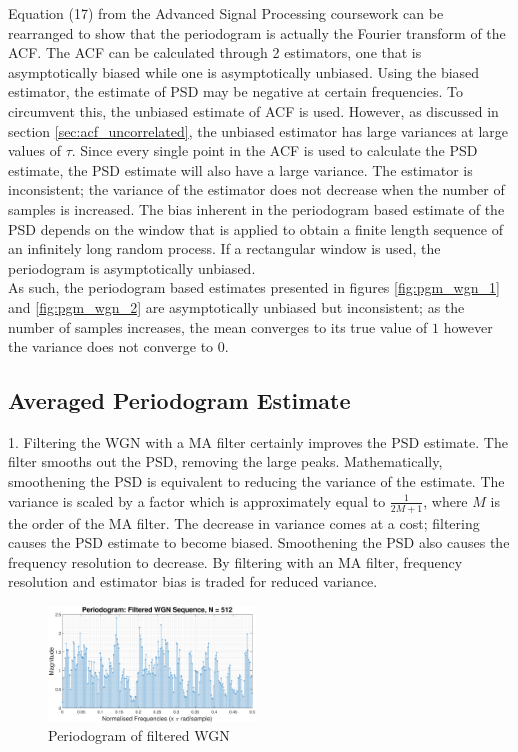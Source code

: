 \documentclass{article}
\begin{document}
Equation (17) from the Advanced Signal Processing coursework can be rearranged to show that the periodogram is actually the Fourier transform of the ACF. The ACF can be calculated through 2 estimators, one that is asymptotically biased while one is asymptotically unbiased. Using the biased estimator, the estimate of PSD may be negative at certain frequencies. To circumvent this, the unbiased estimate of ACF is used. However, as discussed in section \ref{sec:acf_uncorrelated}, the unbiased estimator has large variances at large values of $\tau$. Since every single point in the ACF is used to calculate the PSD estimate, the PSD estimate will also have a large variance. The estimator is inconsistent; the variance of the estimator does not decrease when the number of samples is increased. The bias inherent in the periodogram based estimate of the PSD depends on the window that is applied to obtain a finite length sequence of an infinitely long random process. If a rectangular window is used, the periodogram is asymptotically unbiased.\\

As such, the periodogram based estimates presented in figures \ref{fig:pgm_wgn_1} and \ref{fig:pgm_wgn_2} are asymptotically unbiased but inconsistent; as the number of samples increases, the mean converges to its true value of $1$ however the variance does not converge to $0$.  
\newpage
\subsection{Averaged Periodogram Estimate}

1. Filtering the WGN with a MA filter certainly improves the PSD estimate. The filter smooths out the PSD, removing the large peaks. Mathematically, smoothening the PSD is equivalent to reducing the variance of the estimate. The variance is scaled by a factor which is approximately equal to $\frac{1}{2M+1}$, where $M$ is the order of the MA filter. The decrease in variance comes at a cost; filtering causes the PSD estimate to become biased. Smoothening the PSD also causes the frequency resolution to decrease. By filtering with an MA filter, frequency resolution and estimator bias is traded for reduced variance. 

\begin{figure}[H]
    \centering
    \includegraphics[width=0.49\textwidth]{pgm_filtered_wgn_512}
    \caption{Periodogram of filtered WGN}
    \label{fig:pgm_filtered_wgn}
\end{figure}
\end{document}
